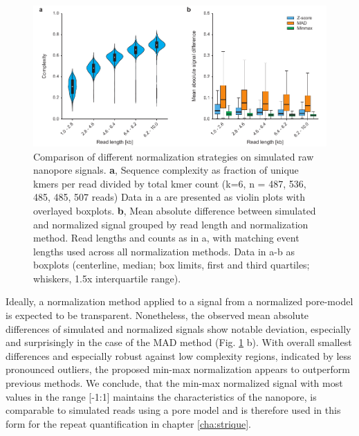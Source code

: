 \begin{figure}[h]
	\centering
	\includegraphics[width=1.0\textwidth]{figures/signal/norm_methods.pdf}
	\captionsetup{format=plain}
	\caption[Signal normalization on simulated reads]{Comparison of different normalization strategies on simulated raw nanopore signals. \textbf{a}, Sequence complexity as fraction of unique kmers per read divided by total kmer count (k=6, n = 487, 536, 485, 485, 507 reads) Data in a are presented as violin plots with overlayed boxplots. \textbf{b}, Mean absolute difference between simulated and normalized signal grouped by read length and normalization method. Read lengths and counts as in a, with matching event lengths used across all normalization methods. Data in a-b as boxplots (centerline, median; box limits, first and third quartiles; whiskers, 1.5x interquartile range).}
	\label{fig:signal:norm_methods}
\end{figure}

Ideally, a normalization method applied to a signal from a normalized pore-model is expected to be transparent. Nonetheless, the observed mean absolute differences of simulated and normalized signals show notable deviation, especially and surprisingly in the case of the MAD method (Fig. \ref{fig:signal:norm_methods} b). With overall smallest differences and especially robust against low complexity regions, indicated by less pronounced outliers, the proposed min-max normalization appears to outperform previous methods. We conclude, that the min-max normalized signal with most values in the range [-1:1] maintains the characteristics of the nanopore, is comparable to simulated reads using a pore model and is therefore used in this form for the repeat quantification in chapter \ref{cha:strique}.

